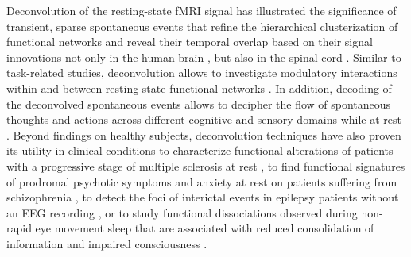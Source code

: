 Deconvolution of the resting-state fMRI signal has illustrated the significance
of transient, sparse spontaneous events
\citep{Petridou2012PeriodsrestfMRI,Allan2015FunctionalConnectivityMRI} that
refine the hierarchical clusterization of functional networks
\citep{Karahanoglu2013TotalactivationfMRI} and reveal their temporal overlap
based on their signal innovations not only in the human brain
\citep{Karahanoglu2015Transientbrainactivity}, but also in the spinal cord
\citep{Kinany2020DynamicFunctionalConnectivity}. Similar to task-related
studies, deconvolution allows to investigate modulatory interactions within and
between resting-state functional networks
\citep{Di2013ModulatoryInteractionsResting,Di2015Characterizationsrestingstate}.
In addition, decoding of the deconvolved spontaneous events allows to decipher
the flow of spontaneous thoughts and actions across different cognitive and
sensory domains while at rest
\citep{Karahanoglu2015Transientbrainactivity,GonzalezCastillo2019Imagingspontaneousflow,Tan_2017}.
Beyond findings on healthy subjects, deconvolution techniques have also proven
its utility in clinical conditions to characterize functional alterations of
patients with a progressive stage of multiple sclerosis at rest
\citep{Bommarito2020Alteredanteriordefault}, to find functional signatures
of prodromal psychotic symptoms and anxiety at rest on patients suffering from
schizophrenia \citep{Zoeller2019Largescalebrain}, to detect the foci of
interictal events in epilepsy patients without an EEG recording
\citep{Lopes2012Detectionepilepticactivity,Karahanoglu2013Spatialmappinginterictal},
or to study functional dissociations observed during non-rapid eye movement
sleep that are associated with reduced consolidation of information and impaired
consciousness \citep{Tarun2020NREMsleepstages}.

